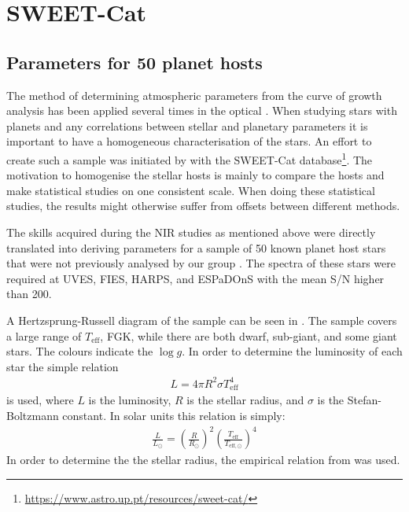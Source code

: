 

\chapter{SWEET-Cat}
\label{sec:SWEET-Cat}

\section{Parameters for 50 planet hosts}



The method of determining atmospheric parameters from the curve of growth analysis has been applied
several times in the optical \citep[see e.g.][]{Mortier2013b,Tsantaki2013,Sousa2011,Santos2013}.
When studying stars with planets and any correlations between stellar and planetary parameters it is
important to have a homogeneous characterisation of the stars. An effort to create such a sample was
initiated by \citet{Santos2013} with the SWEET-Cat
database\footnote{\url{https://www.astro.up.pt/resources/sweet-cat/}}. The motivation to homogenise
the stellar hosts is mainly to compare the hosts and make statistical studies on one consistent
scale. When doing these statistical studies, the results might otherwise suffer from offsets between
different methods.

The skills acquired during the NIR studies as mentioned above were directly translated into deriving
parameters for a sample of 50 known planet host stars that were not previously analysed by our group
\citep{Andreasen2017a}. The spectra of these stars were required at UVES, FIES, HARPS, and ESPaDOnS
with the mean S/N higher than 200.

A Hertzsprung-Russell diagram of the sample can be seen in . The sample covers a
large range of $T_\mathrm{eff}$, FGK, while there are both dwarf, sub-giant, and some giant stars.
The colours indicate the $\log g$. In order to determine the luminosity of each star the simple
relation
\begin{align*}
  L = 4\pi R^2 \sigma T^4_\mathrm{eff}
\end{align*}
is used, where $L$ is the luminosity, $R$ is the stellar radius, and $\sigma$ is the
Stefan-Boltzmann constant. In solar units this relation is simply:
\begin{align*}
  \frac{L}{L_\odot} = \left(\frac{R}{R_\odot}\right)^2 \left(\frac{T_\mathrm{eff}}{T_{\mathrm{eff},\odot}}\right)^4
\end{align*}
In order to determine the the stellar radius, the empirical relation from \citet{Torres2010} was
used.

